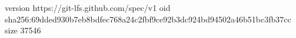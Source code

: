 version https://git-lfs.github.com/spec/v1
oid sha256:69dded930b7eb8bdfec768a24c2fbf9ce92b3dc924bd94502a46b51bc3fb37cc
size 37546
